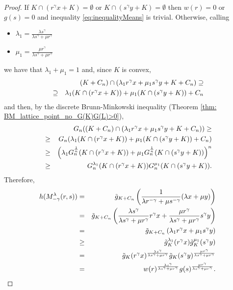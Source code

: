 \documentclass[10pt]{amsart}
\numberwithin{equation}{section}
\begin{document}
\begin{proof}
If $K\cap(r^\gamma x+K)=\emptyset$ or $K\cap(s^\gamma y+K)=\emptyset$ then $w(r)=0$ or $g(s)=0$ and inequality \eqref{eq:inequalityMeans} is trivial. Otherwise, calling
\begin{itemize}
\item $\lambda_1=\frac{\lambda s^\gamma}{\lambda s^\gamma+\mu r^\gamma}$
\item $\mu_1=\frac{\mu r^\gamma}{\lambda s^\gamma+\mu r^\gamma}$
\end{itemize}
we have that $\lambda_1+\mu_1=1$ and, since $K$ is convex,
\begin{eqnarray*}
&&(K+C_n)\cap(\lambda_1r^\gamma x+\mu_1s^\gamma y+K+C_n)\supseteq\cr
&\supseteq& \lambda_1(K\cap(r^\gamma x+K))+\mu_1(K\cap(s^\gamma y+K))+C_n
\end{eqnarray*}
and then, by the discrete Brunn-Minkowski inequality (Theorem \ref{thm: BM_lattice_point_no_G(K)G(L)>0}),
\begin{eqnarray*}
&&G_n((K+C_n)\cap(\lambda_1r^\gamma x+\mu_1s^\gamma y+K+C_n))\geq\cr
&\geq& G_n(\lambda_1(K\cap(r^\gamma x+K))+\mu_1(K\cap(s^\gamma y+K))+C_n)\cr
&\geq&\left(\lambda_1G_n^\frac{1}{n}(K\cap(r^\gamma x+K))+\mu_1G_n^\frac{1}{n}(K\cap(s^\gamma y+K))\right)^n\cr
&\geq&G_n^{\lambda_1}(K\cap(r^\gamma x+K))G_n^{\mu_1}(K\cap(s^\gamma y+K)).
\end{eqnarray*}
Therefore,
\begin{eqnarray*}
h(M_{-\gamma}^\lambda(r,s))&=&\tilde{g}_{K+C_n}\left(\frac{1}{\lambda r^{-\gamma}+\mu s^{-\gamma}}(\lambda x+\mu y)\right)\cr
&=&\tilde{g}_{K+C_n}\left(\frac{\lambda s^\gamma}{\lambda s^\gamma+\mu r^\gamma}r^\gamma x+\frac{\mu r^\gamma}{\lambda s^\gamma+\mu r^\gamma}s^\gamma y\right)\cr
&=&\tilde{g}_{K+C_n}\left(\lambda_1r^\gamma x+\mu_1s^\gamma y\right)\cr
&\geq&\tilde{g}_K^{\lambda_1}(r^\gamma x)\tilde{g}_K^{\mu_1}(s^\gamma y)\cr
&=&\tilde{g}_K(r^\gamma x)^{\frac{\lambda s^\gamma}{\lambda s^\gamma+\mu r^\gamma}}\tilde{g}_K(s^\gamma y)^{\frac{\mu r^\gamma}{\lambda s^\gamma+\mu r^\gamma}}\cr
&=&w(r)^{\frac{\lambda s^\gamma}{\lambda s^\gamma+\mu r^\gamma}}g(s)^{\frac{\mu r^\gamma}{\lambda s^\gamma+\mu r^\gamma}}.\cr
\end{eqnarray*}


\end{proof}
\end{document}
